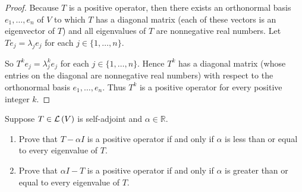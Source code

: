 \begin{proof}
    Because $T$ is a positive operator, then there exists an orthonormal basis $e_{1}, \ldots, e_{n}$ of $V$ to which $T$ has a diagonal matrix (each of these vectors is an eigenvector of $T$) and all eigenvalues of $T$ are nonnegative real numbers. Let $Te_{j} = \lambda_{j}e_{j}$ for each $j\in\{ 1, \ldots, n \}$.

    So $T^{k}e_{j} = \lambda_{j}^{k}e_{j}$ for each $j\in\{ 1, \ldots, n \}$. Hence $T^{k}$ has a diagonal matrix (whose entries on the diagonal are nonnegative real numbers) with respect to the orthonormal basis $e_{1}, \ldots, e_{n}$. Thus $T^{k}$ is a positive operator for every positive integer $k$.
\end{proof}

\newpage

\begin{exercise}
    Suppose $T \in \mathcal{L}\left({V}\right)$ is self-adjoint and $\alpha\in\mathbb{R}$.
    \begin{enumerate}[label={(\alph*)}]
        \item Prove that $T - \alpha I$ is a positive operator if and only if $\alpha$ is less than or equal to every eigenvalue of $T$.
        \item Prove that $\alpha I - T$ is a positive operator if and only if $\alpha$ is greater than or equal to every eigenvalue of $T$.
    \end{enumerate}
\end{exercise}

